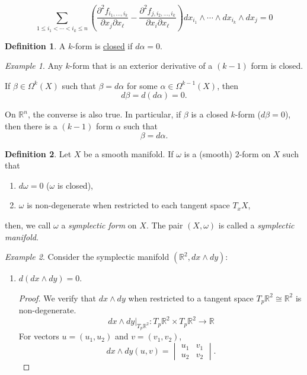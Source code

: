 \documentclass[11pt]{article}
\theoremstyle{definition}
\newtheorem{definition}{Definition}[section]
\theoremstyle{remark}
\newtheorem{example}{Example}[section]
\begin{document}
\[
\sum_{1 \leq i_1 < \cdots < i_k \leq n} \left( \frac{\partial^2 f_{i_1,\ldots,i_k}}{\partial x_j \partial x_\ell} - \frac{\partial^2 f_{j,i_2,\ldots,i_k}}{\partial x_i \partial x_\ell} \right) dx_{i_1} \wedge \cdots \wedge dx_{i_k} \wedge dx_j = 0
\]

\begin{definition}\label{def:closed-form}
A $k$-form is \underline{closed} if $d\alpha = 0$.
\end{definition}

\begin{example}\label{ex:exterior-derivative-closed}
Any $k$-form that is an exterior derivative of a $(k-1)$ form is closed.

If $\beta \in \Omega^k(X)$ such that $\beta = d\alpha$ for some $\alpha \in \Omega^{k-1}(X)$, then
\[
d\beta = d(d\alpha) = 0.
\]

On $\mathbb{R}^n$, the converse is also true. In particular, if $\beta$ is a closed $k$-form ($d\beta = 0$), then there is a $(k-1)$ form $\alpha$ such that
\[
\beta = d\alpha.
\]
\end{example}

\begin{definition}\label{def:symplectic_form}
Let $X$ be a smooth manifold. If $\omega$ is a (smooth) $2$-form on $X$ such that
\begin{enumerate}[(1)]
    \item $d\omega = 0$ ($\omega$ is closed),
    \item $\omega$ is non-degenerate when restricted to each tangent space $T_x X$,
\end{enumerate}
then, we call $\omega$ a \emph{symplectic form} on $X$. The pair $(X, \omega)$ is called a \emph{symplectic manifold}.
\end{definition}

\begin{example}\label{ex:R2_symplectic}
Consider the symplectic manifold $(\mathbb{R}^2, dx \wedge dy)$:
\begin{enumerate}
    \item $d(dx \wedge dy) = 0$.
    \begin{proof}
        We verify that $dx \wedge dy$ when restricted to a tangent space $T_p \mathbb{R}^2 \cong \mathbb{R}^2$ is non-degenerate.
        \[
        dx \wedge dy \big|_{T_p \mathbb{R}^2} : T_p \mathbb{R}^2 \times T_p \mathbb{R}^2 \to \mathbb{R}
        \]
        For vectors $u = (u_1, u_2)$ and $v = (v_1, v_2)$,
        \[
        dx \wedge dy (u, v) = \begin{vmatrix}
            u_1 & v_1 \\
            u_2 & v_2
        \end{vmatrix}.
        \]
    \end{proof}
\end{enumerate}
\end{example}
\end{document}
